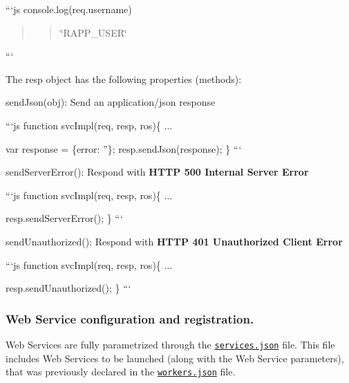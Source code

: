 ```js console.\-log(req.\-username) \begin{quotation}
\begin{quotation}
\char`\"{}\-R\-A\-P\-P\-\_\-\-U\-S\-E\-R\char`\"{}

\end{quotation}


\end{quotation}
```

The {\ttfamily resp} object has the following properties (methods)\-:


\begin{DoxyItemize}
\item send\-Json(obj)\-: Send an application/json response
\end{DoxyItemize}

```js function svc\-Impl(req, resp, ros)\{ ...

var response = \{error\-: ''\}; resp.\-send\-Json(response); \} ```


\begin{DoxyItemize}
\item {\ttfamily send\-Server\-Error()}\-: Respond with {\bfseries H\-T\-T\-P 500 Internal Server Error}
\end{DoxyItemize}

```js function svc\-Impl(req, resp, ros)\{ ...

resp.\-send\-Server\-Error(); \} ```


\begin{DoxyItemize}
\item {\ttfamily send\-Unauthorized()}\-: Respond with {\bfseries H\-T\-T\-P 401 Unauthorized Client Error}
\end{DoxyItemize}

```js function svc\-Impl(req, resp, ros)\{ ...

resp.\-send\-Unauthorized(); \} ```

\subsubsection*{Web Service configuration and registration.}

Web Services are fully parametrized through the \href{https://github.com/rapp-project/rapp-platform/blob/master/rapp_web_services/config/services/services.json}{\tt services.\-json} file. This file includes Web Services to be launched (along with the Web Service parameters), that was previously declared in the \href{https://github.com/rapp-project/rapp-platform/blob/master/rapp_web_services/config/services/workers.json}{\tt workers.\-json} file.

